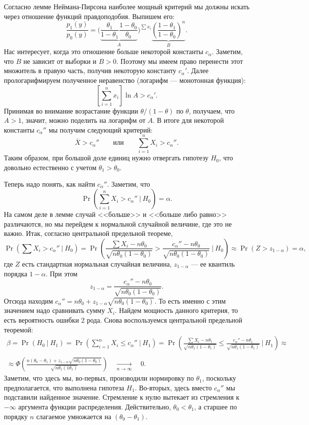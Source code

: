 Согласно лемме Неймана-Пирсона наиболее мощный критерий мы должны
искать через отношение функций правдоподобия. Выпишем его:
\[
    \frac{p_1(y)}{p_0(y)} = \Big( \underbrace{\frac{\theta_1}{1
    - \theta_1} \frac{1-\theta_0}{\theta_0}}_{A} \Big)^{\sum
    x_i} \underbrace{\left( \frac{1-\theta_1}{1-\theta_0}
    \right)^n}_{B}.
    \]
Нас интересует, когда это отношение больше некоторой константы
$c_\alpha$. Заметим, что $B$ не зависит от выборки и $B>0$.
Поэтому мы имеем право перенести этот множитель в правую часть,
получив некоторую константу $c_\alpha'$. Далее прологарифмируем
полученное неравенство (логарифм --- монотонная функция):
\[
    \left[ \sum_{i=1}^n x_i \right] \ln{A} > c_\alpha'.
    \]
Принимая во внимание возрастание функции $\theta / (1 - \theta)$
по $\theta$, получаем, что $A > 1$, значит, можно поделить на
логарифм от $A$. В итоге для некоторой константы $c_\alpha''$ мы
получим следующий критерий:
\[
    \overline{X} > c_\alpha'' \qquad \text{или} \qquad
    \sum_{i=1}^n X_i > c_\alpha''.
    \]
Таким образом, при большой доле единиц нужно отвергать гипотезу
$H_0$, что довольно естественно с учетом $\theta_1 > \theta_0$.

Теперь надо понять, как найти $c_\alpha''$. Заметим, что
\[
    \Pr\left(\sum_{i=1}^n X_i > c_\alpha''\ |\ H_0\right) = \alpha.
    \]
На самом деле в лемме случай <<больше>> и <<больше либо равно>>
различаются, но мы перейдем к нормальной случайной величине, где
это не важно. Итак, согласно центральной предельной теореме,
\[
    \Pr\left(\sum X_i > c_\alpha''\ |\ H_0\right) = \Pr\left(
    \frac{\sum X_i - n\theta_0}{\sqrt{n\theta_0(1-\theta_0)}} >
    \frac{c_\alpha'' - n\theta_0}{\sqrt{n\theta_0(1-\theta_0)}}\
    \Big|\ H_0\right) \approx \Pr(Z > z_{1-\alpha}) = \alpha,
    \]
где $Z$ есть стандартная нормальная случайная величина, $z_{1-\alpha}$
--- ее квантиль порядка $1-\alpha$. При этом
\[
    z_{1-\alpha} = \frac{c_\alpha'' - n\theta_0}{\sqrt{n\theta_0
    (1-\theta_0)}}.
    \]
Отсюда находим $c_\alpha'' = n\theta_0 + z_{1-\alpha}\sqrt{n\theta_0
(1-\theta_0)}$. То есть именно с этим значением надо сравнивать
сумму $X_i$. Найдем мощность данного критерия, то есть вероятность
ошибки 2 рода. Снова воспользуемся центральной предельной теоремой:
\begin{multline*}
    \beta = \Pr(H_0\ |\ H_1) = \Pr\left(\sum_{i=1}^n X_i \leqslant
    c_\alpha''\ |\ H_1 \right) = \Pr\left( \frac{\sum X_i-n\theta_1}{ 
    \sqrt{n\theta_1(1-\theta_1)}} \leqslant \frac{c_\alpha'' -
    n\theta_1}{\sqrt{n\theta_1(1-\theta_1)}}\ \Big|\ H_1 \right)
    \approx \\\\ \approx \Phi\left( \frac{n(\theta_0-\theta_1) +
    z_{1-\alpha} \sqrt{n\theta_0(1-\theta_0)}}{\sqrt{n\theta_1(1
    \theta_1)}} \right) \quad \underset{n \to \infty}{\longrightarrow}
    \quad 0.
\end{multline*}
Заметим, что здесь мы, во-первых, производили нормировку по $\theta_1$,
поскольку предполагается, что выполнена гипотеза $H_1$. Во-вторых,
здесь вместо $c_\alpha''$ мы подставили найденное значение. Стремление
к нулю вытекает из стремления к $-\infty$ аргумента функции
распределения. Действительно, $\theta_0 < \theta_1$, а старшее по
порядку $n$ слагаемое умножается на $(\theta_0 - \theta_1)$.

